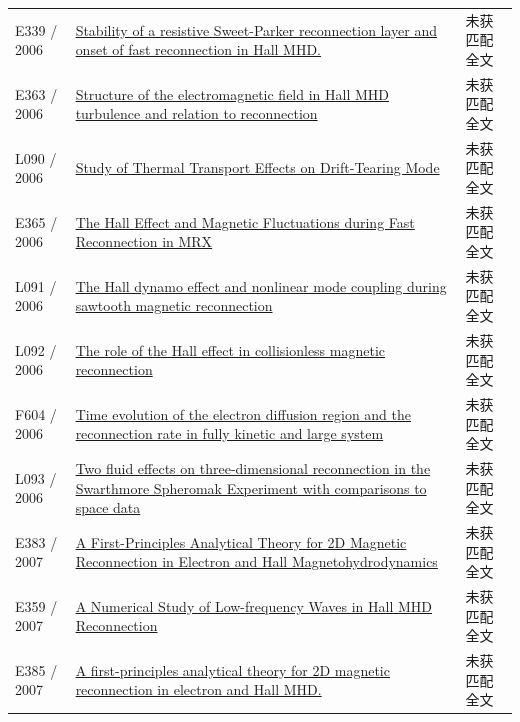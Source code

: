 \begin{longtable}{P{24mm}P{97mm}P{27mm}}
E339 / 2006 & \href{http://absimage.aps.org/image/DPP06/MWS_DPP06-2006-000316.pdf}{Stability of a resistive Sweet-Parker reconnection layer and onset of fast reconnection in Hall MHD.} & 未获匹配全文\\

E363 / 2006 & \href{http://ui.adsabs.harvard.edu/abs/2006AGUFMSM41A1454D/abstract}{Structure of the electromagnetic field in Hall MHD turbulence and relation to reconnection} & 未获匹配全文\\

L090 / 2006 & \href{https://doi.org/10.15017/26818}{Study of Thermal Transport Effects on Drift-Tearing Mode} & 未获匹配全文\\

E365 / 2006 & \href{http://absimage.aps.org/image/DPP06/MWS_DPP06-2006-000815.pdf}{The Hall Effect and Magnetic Fluctuations during Fast Reconnection in MRX} & 未获匹配全文\\

L091 / 2006 & \href{https://doi.org/10.1063/1.2363353}{The Hall dynamo effect and nonlinear mode coupling during sawtooth magnetic reconnection} & 未获匹配全文\\

L092 / 2006 & \href{https://doi.org/10.1016/j.asr.2004.11.045}{The role of the Hall effect in collisionless magnetic reconnection} & 未获匹配全文\\

F604 / 2006 & \href{https://doi.org/10.1063/1.2220534}{Time evolution of the electron diffusion region and the reconnection rate in fully kinetic and large system} & 未获匹配全文\\

L093 / 2006 & \href{https://doi.org/10.1063/1.2180729}{Two fluid effects on three-dimensional reconnection in the Swarthmore Spheromak Experiment with comparisons to space data} & 未获匹配全文\\

E383 / 2007 & \href{http://ui.adsabs.harvard.edu/abs/2007AGUFMSH44A1721C/abstract}{A First-Principles Analytical Theory for 2D Magnetic Reconnection in Electron and Hall Magnetohydrodynamics} & 未获匹配全文\\

E359 / 2007 & \href{https://doi.org/10.1016/j.chinastron.2007.10.004}{A Numerical Study of Low-frequency Waves in Hall MHD Reconnection} & 未获匹配全文\\

E385 / 2007 & \href{http://absimage.aps.org/image/DPP07/MWS_DPP07-2007-000437.pdf}{A first-principles analytical theory for 2D magnetic reconnection in electron and Hall MHD.} & 未获匹配全文\\


\end{longtable}
